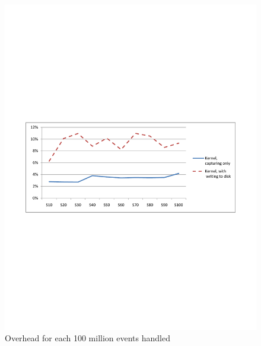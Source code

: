 \begin{figure}[h] 
\begin{centering} 
\includegraphics[scale=0.6, clip=true, viewport=1cm 10cm 20cm 19cm]{images/diagrams/Performance_100M.pdf} 
\caption{Overhead for each 100 million events handled} 
\label{Performance_100M} 
\end{centering} 
\end{figure}

